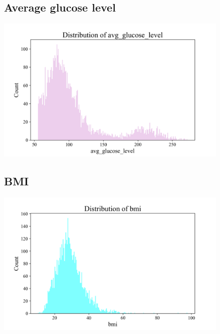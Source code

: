 \subsection{Average glucose level}
\includegraphics[height=7cm]{./images/avg_glucose_distribution.png}

\subsection{BMI}
\includegraphics[height=7cm]{./images/bmi_distribution.png}



